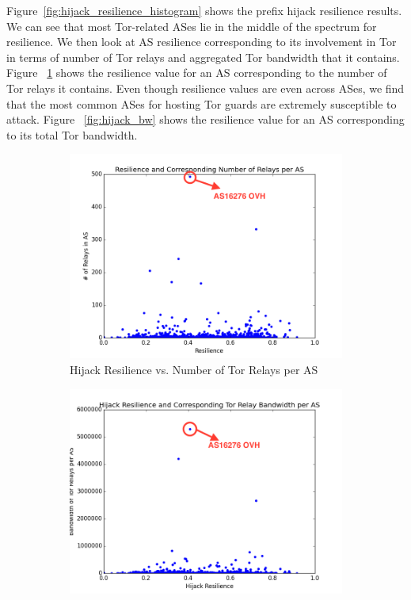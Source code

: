 Figure~\ref{fig:hijack_resilience_histogram} shows the prefix hijack resilience results. We can see that most Tor-related ASes lie in the middle of the spectrum for resilience. We then look at AS resilience corresponding to its involvement in Tor in terms of number of Tor relays and aggregated Tor bandwidth that it contains. Figure ~\ref{fig:res_relays} shows the resilience value for an AS corresponding to the number of Tor relays it contains. Even though resilience values are even across ASes, we find that the most common ASes for hosting Tor guards are extremely susceptible to attack. Figure ~\ref{fig:hijack_bw} shows the resilience value for an AS corresponding to its total Tor bandwidth. 

\begin{figure}[ht!]
\centering
\begin{subfigure}{.25\textwidth}
  \centering
  \includegraphics[width=\linewidth]{figure/new_resilience_per_as}
  \caption{Hijack Resilience vs. Number of Tor Relays per AS}
  \label{fig:res_relays}
\end{subfigure}%
\begin{subfigure}{.25\textwidth}
  \centering
  \includegraphics[width=\linewidth]{figure/new_bandwidth}

\end{subfigure}
\end{figure}

